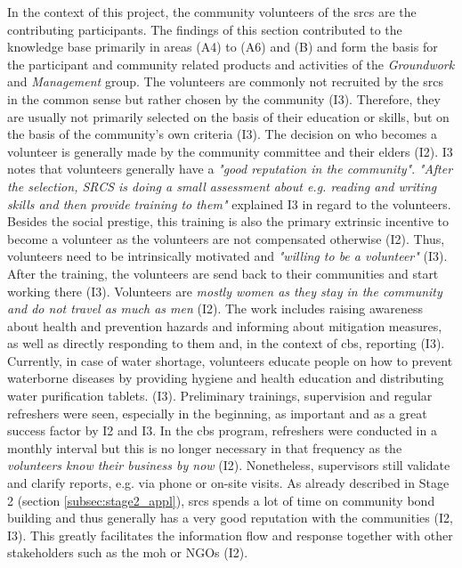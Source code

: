 In the context of this project, the community volunteers of the \acrshort{srcs} are the contributing participants. The findings of this section contributed to the knowledge base primarily in areas (A4) to (A6) and (B) and form the basis for the participant and community related products and activities of the \textit{Groundwork} and \textit{Management} group. The volunteers are commonly not recruited by the \acrshort{srcs} in the common sense but rather chosen by the community (I3). Therefore, they are usually not primarily selected on the basis of their education or skills, but on the basis of the community's own criteria (I3). The decision on who becomes a volunteer is generally made by the community committee and their elders (I2). I3 notes that volunteers generally have a \textit{"good reputation in the community"}. \textit{"After the selection, SRCS is doing a small assessment about e.g. reading and writing skills and then provide training to them"} explained I3 in regard to the volunteers. Besides the social prestige, this training is also the primary extrinsic incentive to become a volunteer as the volunteers are not compensated otherwise (I2). Thus, volunteers need to be intrinsically motivated and \textit{"willing to be a volunteer"} (I3). After the training, the volunteers are send back to their communities and start working there (I3). Volunteers are \textit{mostly women as they stay in the community and do not travel as much as men} (I2). The work includes raising awareness about health and prevention hazards and informing about mitigation measures, as well as directly responding to them and, in the context of \acrshort{cbs}, reporting (I3). Currently, in case of water shortage, volunteers educate people on how to prevent waterborne diseases by providing hygiene and health education and distributing water purification tablets. (I3).\newline
Preliminary trainings, supervision and regular refreshers were seen, especially in the beginning, as important and as a great success factor by I2 and I3. In the \acrshort{cbs} program, refreshers were conducted in a monthly interval but this is no longer necessary in that frequency as the \textit{volunteers know their business by now} (I2). Nonetheless, supervisors still validate and clarify reports, e.g. via phone or on-site visits. As already described in Stage 2 (section \ref*{subsec:stage2_appl}), \acrshort{srcs} spends a lot of time on community bond building and thus generally has a very good reputation with the communities (I2, I3). This greatly facilitates the information flow and response together with other stakeholders such as the \acrshort{moh} or NGOs (I2).\newline
